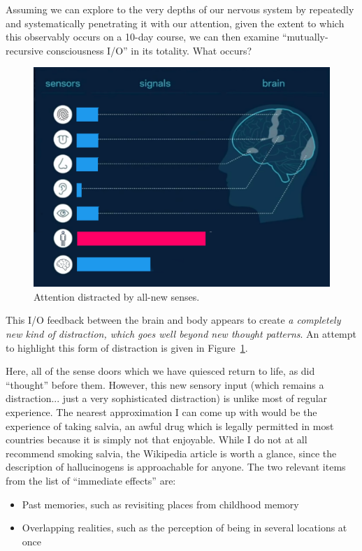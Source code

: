 \documentclass{article}
\begin{document}
Assuming we can explore to the very depths of our nervous system by repeatedly and systematically penetrating it with our attention, given the extent to which this observably occurs on a 10-day course, we can then examine ``mutually-recursive consciousness I/O'' in its totality. What occurs?

\begin{figure}[h]
  \centering
  \includegraphics[width=\linewidth]{images/ma-vipassana4.png}
  \caption{Attention distracted by all-new senses.}
  \label{fig:vipassana-sense-map-4}
\end{figure}

This I/O feedback between the brain and body appears to create \textit{a completely new kind of distraction, which goes well beyond new thought patterns}. An attempt to highlight this form of distraction is given in Figure~\ref{fig:vipassana-sense-map-4}.

Here, all of the sense doors which we have quiesced return to life, as did ``thought'' before them. However, this new sensory input (which remains a distraction... just a very sophisticated distraction) is unlike most of regular experience. The nearest approximation I can come up with would be the experience of taking salvia, an awful drug which is legally permitted in most countries because it is simply not that enjoyable. While I do not at all recommend smoking salvia, the Wikipedia article \cite{salvia} is worth a glance, since the description of hallucinogens is approachable for anyone. The two relevant items from the list of ``immediate effects'' are:

\begin{itemize}
  \item Past memories, such as revisiting places from childhood memory
  \item Overlapping realities, such as the perception of being in several locations at once
\end{itemize}
\end{document}
